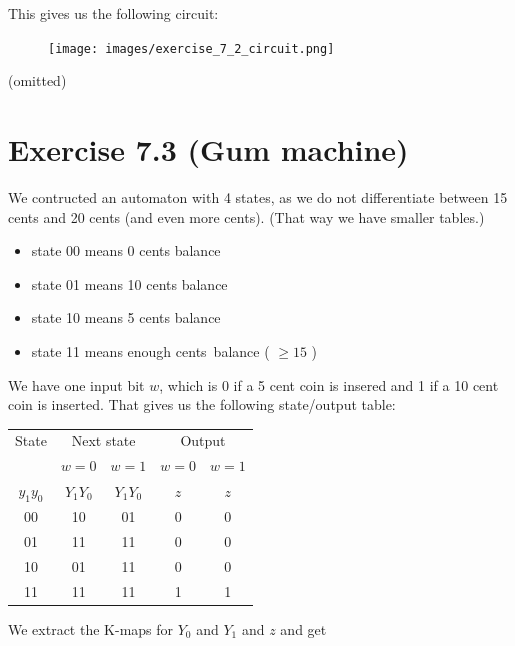 \documentclass[10pt,a4paper]{scrartcl}
\newcommand{\subExercise}[1]{\vspace{0.5em} \noindent{\bf #1)}}
\begin{document}
\noindent This gives us the following circuit:
\begin{figure}[h]
  \texttt{[image: images/exercise\_7\_2\_circuit.png]}
\end{figure}

\FloatBarrier
\subExercise{c} (omitted)

\FloatBarrier
\section*{Exercise 7.3 (Gum machine)}

We contructed an automaton with 4 states, as we do not differentiate between 15 cents and 20 cents (and even more cents). (That way we have smaller tables.) 
\begin{itemize}
\item state 00 means 0 cents balance
\item state 01 means 10 cents balance
\item state 10 means 5 cents balance
\item state 11 means \glqq enough cents\grqq \ balance ( $\geq 15$ )
\end{itemize}

We have one input bit $w$, which is 0 if a 5 cent coin is insered and 1 if a 10 cent coin is inserted. That gives us the following state/output table:


\begin{tabular}{|c||c|c||c|c|}
  \hline
 State   & \multicolumn{2}{c||}{Next state} & \multicolumn{2}{c|}{Output} \\
         & $w=0$        & $w=1$            & $w=0$       & $w=1$ \\
$y_1y_0$ & $Y_1Y_0$     & $Y_1Y_0$         & $z$         & $z$   \\ \hline\hline
00       & 10           & 01               & 0           & 0     \\ \hline  
01       & 11           & 11               & 0           & 0     \\ \hline
10       & 01           & 11               & 0           & 0     \\ \hline
11       & 11           & 11               & 1           & 1     \\ \hline
\end{tabular}

We extract the K-maps for $Y_0$ and $Y_1$ and $z$ and get
\end{document}
